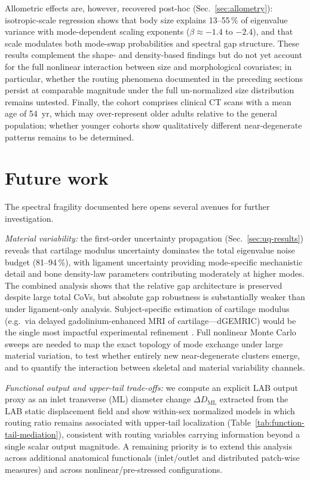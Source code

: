 \documentclass[11pt]{article}
\begin{document}
Allometric effects are, however, recovered post-hoc (Sec.~\ref{sec:allometry}): isotropic-scale regression shows that body size explains 13--55\,\% of eigenvalue variance with mode-dependent scaling exponents ($\beta \approx -1.4$ to $-2.4$), and that scale modulates both mode-swap probabilities and spectral gap structure.
These results complement the shape- and density-based findings but do not yet account for the full nonlinear interaction between size and morphological covariates; in particular, whether the routing phenomena documented in the preceding sections persist at comparable magnitude under the full un-normalized size distribution remains untested.
Finally, the cohort comprises clinical CT scans with a mean age of 54~yr, which may over-represent older adults relative to the general population; whether younger cohorts show qualitatively different near-degenerate patterns remains to be determined.

\section*{Future work}
The spectral fragility documented here opens several avenues for further investigation.

\emph{Material variability:} the first-order uncertainty propagation (Sec.~\ref{sec:uq-results}) reveals that cartilage modulus uncertainty dominates the total eigenvalue noise budget (81--94\,\%), with ligament uncertainty providing mode-specific mechanistic detail and bone density-law parameters contributing moderately at higher modes.
The combined analysis shows that the relative gap architecture is preserved despite large total CoVs, but absolute gap robustness is substantially weaker than under ligament-only analysis.
Subject-specific estimation of cartilage modulus (e.g.\ via delayed gadolinium-enhanced MRI of cartilage---dGEMRIC) would be the single most impactful experimental refinement \citep{Bashir1997dGEMRIC}.
Full nonlinear Monte Carlo sweeps are needed to map the exact topology of mode exchange under large material variation, to test whether entirely new near-degenerate clusters emerge, and to quantify the interaction between skeletal and material variability channels.

\emph{Functional output and upper-tail trade-offs:} we compute an explicit LAB output proxy as an inlet transverse (ML) diameter change $\Delta D_{\mathrm{ML}}$ extracted from the LAB static displacement field and show within-sex normalized models in which routing ratio remains associated with upper-tail localization (Table~\ref{tab:function-tail-mediation}), consistent with routing variables carrying information beyond a single scalar output magnitude.
A remaining priority is to extend this analysis across additional anatomical functionals (inlet/outlet and distributed patch-wise measures) and across nonlinear/pre-stressed configurations.
\end{document}
